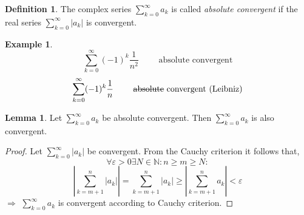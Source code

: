 \documentclass[a4paper,landscape,twocolumn]{article}
\theoremstyle{definition}
\newtheorem{defi}{Definition}
\newtheorem{ex}{Example}
\newtheorem{lemma}{Lemma}
\newcommand\abs[1]{\left|#1\right|}
\begin{document}
\begin{defi}
  The complex series $\sum_{k=0}^\infty a_k$ is called \emph{absolute convergent}
  if the real series $\sum_{k=0}^\infty \abs{a_k}$ is convergent.
\end{defi}
\begin{ex}
  \[ \sum_{k=0}^\infty (-1)^k \frac{1}{n^2} \qquad\text{ absolute convergent} \]
  \[ \sum_{k=0}^\infty (-1)^k \frac{1}{n} \qquad\text{ \sout{absolute} convergent (Leibniz)} \]
\end{ex}
%
\begin{lemma}
  Let $\sum_{k=0}^\infty a_k$ be absolute convergent.
  Then $\sum_{k=0}^\infty a_k$ is also convergent.
\end{lemma}
\begin{proof}
  Let $\sum_{k=0}^\infty \abs{a_k}$ be convergent.
  From the Cauchy criterion it follows that,
  \[ \forall \varepsilon > 0 \exists N \in \mathbb N: n \geq m \geq N: \]
  \[
    \abs{\sum_{k=m+1}^n \abs{a_k}}
    = \sum_{k=m+1}^n \abs{a_k}
    \geq \abs{\sum_{k=m+1}^n a_k}
    < \varepsilon
  \]
  $\Rightarrow$ $\sum_{k=0}^\infty a_k$ is convergent according to Cauchy criterion.
\end{proof}
%
\end{document}
